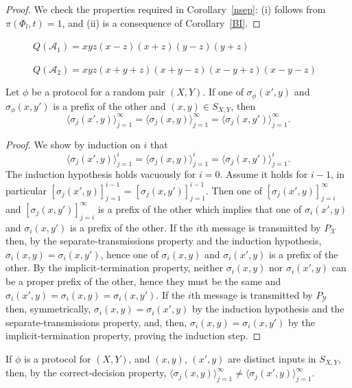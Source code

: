 \documentclass[manuscript, printscheme]{aomart}
\newtheorem[{}\it]{thm}{Theorem}[section]
\theoremstyle{definition}
\newtheorem*[{}\it]{notation}{Notation}
\newcommand{\A}{\mathcal{A}}
\newcommand{\st}{\sigma}
\newcommand{\XcY}{{(X,Y)}}
\newcommand{\SXY}{{S_{X,Y}}}
\newcommand{\PY}{{P_{\mathcal{Y}}}}
\newcommand{\X}{\mathcal{X}}
\begin{document}
\begin{proof}
We check the properties required in Corollary~\ref{nsep}:
(i) follows from $\pi (\Phi_{ l},t) = 1$, and (ii) is a
consequence of Corollary~\ref{BI}.
\end{proof}

\begin{figure}
\vspace{5cm}
\caption[]{$Q(\A_{1}) = xyz(x-z)(x+z)(y-z)(y+z)$}
\end{figure}

\begin{figure}
\vspace{5cm}
\caption[]{$Q(\A_{2})= xyz(x+y+z)(x+y-z)(x-y+z)(x-y-z)$}
\end{figure}


\begin{thm}
\label{T_first_the_int}
Let $\phi$ be a protocol for a random pair $\XcY$.
If one of $\st_\phi(x',y)$ and $\st_\phi(x,y')$ is a prefix of the other
and $(x,y)\in\SXY$, then
\[
\langle \st_j(x',y)\rangle_{j=1}^\infty
=\langle \st_j(x,y)\rangle_{j=1}^\infty
=\langle \st_j(x,y')\rangle_{j=1}^\infty .
\]
\end{thm}
\begin{proof}
We show by induction on $i$ that
\[
\langle \st_j(x',y)\rangle_{j=1}^i
=\langle \st_j(x,y)\rangle_{j=1}^i
=\langle \st_j(x,y')\rangle_{j=1}^i.
\]
The induction hypothesis holds vacuously for $i=0$. Assume it holds for
$i-1$, in particular
$[\st_j(x',y)]_{j=1}^{i-1}=[\st_j(x,y')]_{j=1}^{i-1}$. Then one of
$[\st_j(x',y)]_{j=i}^{\infty}$ and $[\st_j(x,y')]_{j=i}^{\infty}$ is a
prefix of the other which implies that one of $\st_i(x',y)$ and
$\st_i(x,y')$ is a prefix of the other. If the $i$th message is
transmitted by $P_\X$ then, by the separate-transmissions property and
the induction hypothesis, $\st_i(x,y)=\st_i(x,y')$, hence one of
$\st_i(x,y)$ and $\st_i(x',y)$ is a prefix of the other. By the
implicit-termination property, neither $\st_i(x,y)$ nor $\st_i(x',y)$
can be a proper prefix of the other, hence they must be the same and
$\st_i(x',y)=\st_i(x,y)=\st_i(x,y')$. If the $i$th message is
transmitted by $\PY$ then, symmetrically, $\st_i(x,y)=\st_i(x',y)$ by
the induction hypothesis and the separate-transmissions property, and,
then, $\st_i(x,y)=\st_i(x,y')$ by the implicit-termination property,
proving the induction step.
\end{proof}

If $\phi$ is a protocol for $(X,Y)$, and $(x,y)$, $(x',y)$ are distinct
inputs in $\SXY$, then, by the correct-decision property,
$\langle\st_j(x,y)\rangle_{j=1}^\infty\ne\langle
\st_j(x',y)\rangle_{j=1}^\infty$.
\end{document}
